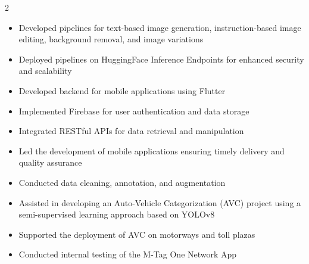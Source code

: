 \documentclass[10pt,a4paper,ragged2e,withhyper]{altacv}
\begin{document}


\makecvheader


\begin{paracol}{2}



\divider


\begin{itemize}
\item Developed pipelines for text-based image generation, instruction-based image editing, background removal, and image variations
\item Deployed pipelines on HuggingFace Inference Endpoints for enhanced security and scalability
\end{itemize}

\divider


\begin{itemize}
\item Developed backend for mobile applications using Flutter
\item Implemented Firebase for user authentication and data storage
\item Integrated RESTful APIs for data retrieval and manipulation
\item Led the development of mobile applications ensuring timely delivery and quality assurance
\end{itemize}

\divider


\begin{itemize}
\item Conducted data cleaning, annotation, and augmentation
\item Assisted in developing an Auto-Vehicle Categorization (AVC) project using a semi-supervised learning approach based on YOLOv8
\item Supported the deployment of AVC on motorways and toll plazas
\item Conducted internal testing of the M-Tag One Network App
\end{itemize}


\end{paracol}
\end{document}
